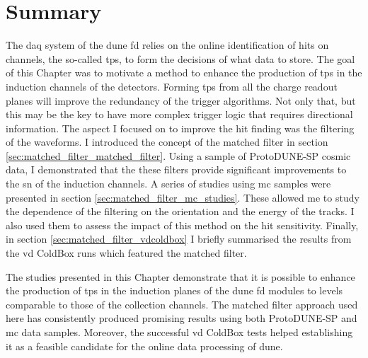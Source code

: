 \section{Summary}

The \gls{daq} system of the \gls{dune} \gls{fd} relies on the online identification of hits on channels, the so-called \gls{tp}s, to form the decisions of what data to store. The goal of this Chapter was to motivate a method to enhance the production of \gls{tp}s in the induction channels of the detectors. Forming \gls{tp}s from all the charge readout planes will improve the redundancy of the trigger algorithms. Not only that, but this may be the key to have more complex trigger logic that requires directional information. The aspect I focused on to improve the hit finding was the filtering of the waveforms. I introduced the concept of the matched filter in section \ref{sec:matched_filter_matched_filter}. Using a sample of ProtoDUNE-SP cosmic data, I demonstrated that the these filters provide significant improvements to the \gls{sn} of the induction channels. A series of studies using \gls{mc} samples were presented in section \ref{sec:matched_filter_mc_studies}. These allowed me to study the dependence of the filtering on the orientation and the energy of the tracks. I also used them to assess the impact of this method on the hit sensitivity. Finally, in section \ref{sec:matched_filter_vdcoldbox} I briefly summarised the results from the \gls{vd} ColdBox runs which featured the matched filter.

The studies presented in this Chapter demonstrate that it is possible to enhance the production of \gls{tp}s in the induction planes of the \gls{dune} \gls{fd} modules to levels comparable to those of the collection channels. The matched filter approach used here has consistently produced promising results using both ProtoDUNE-SP and \gls{mc} data samples. Moreover, the successful \gls{vd} ColdBox tests helped establishing it as a feasible candidate for the online data processing of \gls{dune}.